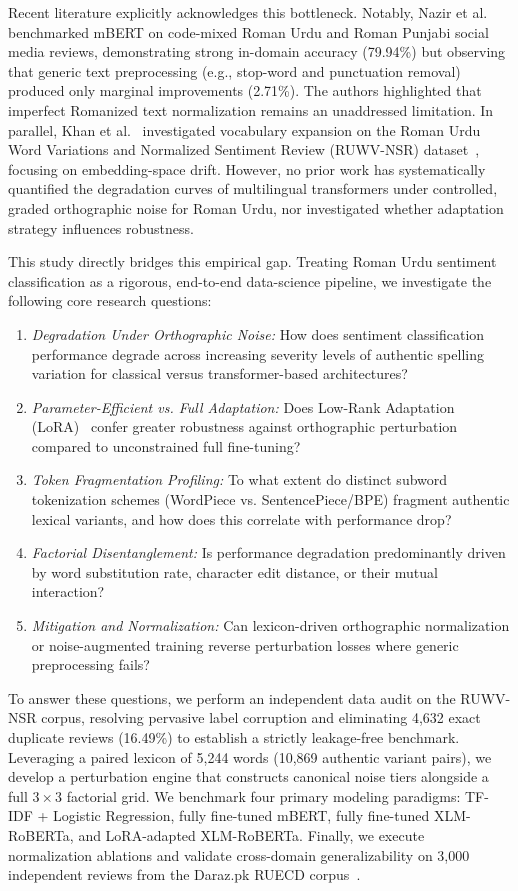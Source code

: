 Recent literature explicitly acknowledges this bottleneck. Notably, Nazir et al.~\cite{nazir2025leveraging} benchmarked mBERT on code-mixed Roman Urdu and Roman Punjabi social media reviews, demonstrating strong in-domain accuracy (79.94\%) but observing that generic text preprocessing (e.g., stop-word and punctuation removal) produced only marginal improvements (2.71\%). The authors highlighted that imperfect Romanized text normalization remains an unaddressed limitation. In parallel, Khan et al.~\cite{khan2026romeva} investigated vocabulary expansion on the Roman Urdu Word Variations and Normalized Sentiment Review (RUWV-NSR) dataset~\cite{ahmed2024ruwvnsr}, focusing on embedding-space drift. However, no prior work has systematically quantified the degradation curves of multilingual transformers under controlled, graded orthographic noise for Roman Urdu, nor investigated whether adaptation strategy influences robustness.

This study directly bridges this empirical gap. Treating Roman Urdu sentiment classification as a rigorous, end-to-end data-science pipeline, we investigate the following core research questions:
\begin{enumerate}
    \item[\textbf{RQ1:}] \textit{Degradation Under Orthographic Noise:} How does sentiment classification performance degrade across increasing severity levels of authentic spelling variation for classical versus transformer-based architectures?
    \item[\textbf{RQ2:}] \textit{Parameter-Efficient vs. Full Adaptation:} Does Low-Rank Adaptation (LoRA)~\cite{hu2022lora} confer greater robustness against orthographic perturbation compared to unconstrained full fine-tuning?
    \item[\textbf{RQ3:}] \textit{Token Fragmentation Profiling:} To what extent do distinct subword tokenization schemes (WordPiece vs. SentencePiece/BPE) fragment authentic lexical variants, and how does this correlate with performance drop?
    \item[\textbf{RQ4:}] \textit{Factorial Disentanglement:} Is performance degradation predominantly driven by word substitution rate, character edit distance, or their mutual interaction?
    \item[\textbf{RQ5:}] \textit{Mitigation and Normalization:} Can lexicon-driven orthographic normalization or noise-augmented training reverse perturbation losses where generic preprocessing fails?
\end{enumerate}

To answer these questions, we perform an independent data audit on the RUWV-NSR corpus, resolving pervasive label corruption and eliminating 4,632 exact duplicate reviews (16.49\%) to establish a strictly leakage-free benchmark. Leveraging a paired lexicon of 5,244 words (10,869 authentic variant pairs), we develop a perturbation engine that constructs canonical noise tiers alongside a full $3 \times 3$ factorial grid. We benchmark four primary modeling paradigms: TF-IDF + Logistic Regression, fully fine-tuned mBERT, fully fine-tuned XLM-RoBERTa, and LoRA-adapted XLM-RoBERTa. Finally, we execute normalization ablations and validate cross-domain generalizability on 3,000 independent reviews from the Daraz.pk RUECD corpus~\cite{chandio2022sentiment}.
